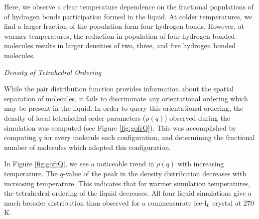 
Here, we observe a clear temperature dependence on the fractional
populations of of hydrogen bonds participation formed in the
liquid. At colder temperatures, we find a larger fraction of the
population form four hydrogen bonds. However, at warmer temperatures,
the reduction in population of four hydrogen bonded molecules results
in larger densities of two, three, and five hydrogen bonded molecules.



\begin{flushleft}
\textit{Density of Tetrahedral Ordering}
\end{flushleft}

While the pair distribution function provides information about
the spatial separation of molecules, it fails to discriminate any
orientational ordering which may be present in the liquid. In order to
query this orientational ordering, the density of local tetrahedral
order parameters ($\rho (q)$) observed during the simulation was
computed (see Figure \ref{fig:gofrQ}). This was accomplished by
computing $q$ for every molecule each configuration, and determining
the fractional number of molecules which adopted this configuration.

In Figure \ref{fig:gofrQ}, we see a noticeable trend in $\rho (q)$
with increasing temperature. The $q$-value of the peak in the density
distribution decreases with increasing temperature. This indicates
that for warmer simulation temperatures, the tetrahedral ordering of
the liquid decreases. All four liquid simulations give a much broader
distribution than observed for a commensurate ice-I$_\mathrm{h}$
crystal at 270 K.





